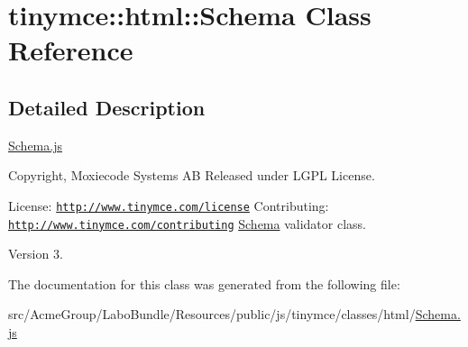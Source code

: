 \hypertarget{classtinymce_1_1html_1_1_schema}{\section{tinymce\+:\+:html\+:\+:Schema Class Reference}
\label{classtinymce_1_1html_1_1_schema}
}


\subsection{Detailed Description}
\hyperlink{_schema_8js}{Schema.\+js}

Copyright, Moxiecode Systems A\+B Released under L\+G\+P\+L License.

License\+: \href{http://www.tinymce.com/license}{\tt http\+://www.\+tinymce.\+com/license} Contributing\+: \href{http://www.tinymce.com/contributing}{\tt http\+://www.\+tinymce.\+com/contributing} \hyperlink{classtinymce_1_1html_1_1_schema}{Schema} validator class.

\begin{DoxyVersion}{Version}
3. 
\end{DoxyVersion}


The documentation for this class was generated from the following file\+:\begin{DoxyCompactItemize}
\item 
src/\+Acme\+Group/\+Labo\+Bundle/\+Resources/public/js/tinymce/classes/html/\hyperlink{_schema_8js}{Schema.\+js}\end{DoxyCompactItemize}
